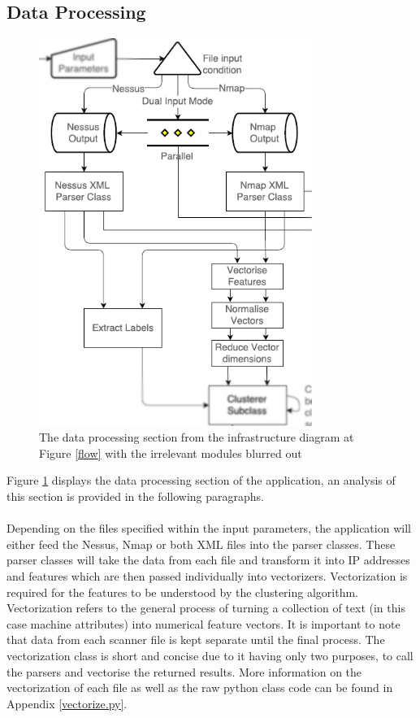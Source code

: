 \subsection{Data Processing}
\label{infra2}

\begin{figure}[!h]
\centering
\includegraphics[width=3.5in]{./Figures/infra2.png}
\caption{The data processing section from the infrastructure diagram at Figure \ref{flow} with the irrelevant modules blurred out}
\label{infra2}
\end{figure}

Figure \ref{infra2} displays the data processing section of the application, an analysis of this section is provided in the following paragraphs. \paragraph{}Depending on the files specified within  the input parameters, the application will either feed the Nessus, Nmap or both XML files into the parser classes. These parser classes will take the data from each file and transform it into IP addresses and features which are then passed individually into vectorizers. Vectorization is required for the features to be understood by the clustering algorithm. Vectorization refers to the general process of turning a collection of text (in this case machine attributes) into numerical feature vectors. It is important to note that data from each scanner file is kept separate until the final process. The vectorization class is short and concise due to it having only two purposes, to call the parsers and vectorise the returned results. More information on the vectorization of each file as well as the raw python class code can be found in Appendix \ref{vectorize.py}.

